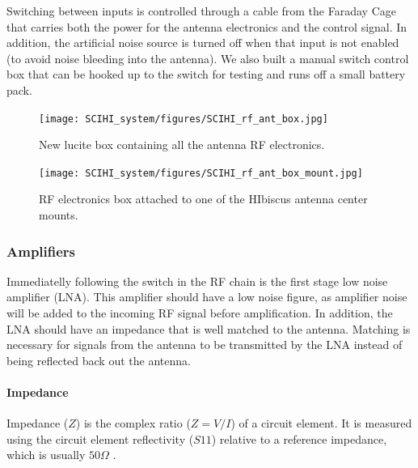 Switching between inputs is controlled through a cable from the Faraday Cage that carries both the power for the antenna electronics and the control signal. In addition, the artificial noise source is turned off when that input is not enabled (to avoid noise bleeding into the antenna). We also built a manual switch control box that can be hooked up to the switch for testing and runs off a small battery pack. 

\begin{figure}[htb]
\centering
\begin{minipage}[b]{0.47\textwidth}
\centering
\texttt{[image: SCIHI\_system/figures/SCIHI\_rf\_ant\_box.jpg]}
\caption{New lucite box containing all the antenna RF electronics.}
\label{Fig:rf_ant_box}
\end{minipage}%
\begin{minipage}[b]{0.02\textwidth}
\hspace{1cm}
\end{minipage}%
\begin{minipage}[b]{0.47\textwidth}
\centering
\texttt{[image: SCIHI\_system/figures/SCIHI\_rf\_ant\_box\_mount.jpg]}
\caption{RF electronics box attached to one of the HIbiscus antenna center mounts.}
\label{Fig:rf_ant_mount}
\end{minipage}
\end{figure}

\subsubsection{Amplifiers} \label{Sec:Amp}

Immediatelly following the switch in the RF chain is the first stage low noise amplifier (LNA). This amplifier should have a low noise figure, as amplifier noise will be added to the incoming RF signal before amplification. In addition, the LNA should have an impedance that is well matched to the antenna. Matching is necessary for signals from the antenna to be transmitted by the LNA instead of being reflected back out the antenna. 

\paragraph{Impedance} 

Impedance ($Z$) is the complex ratio ($Z = V/I$) of a circuit element. It is measured using the circuit element reflectivity ($S11$) relative to a reference impedance, which is usually $50 \Omega$ \cite{stutzman1981}.

